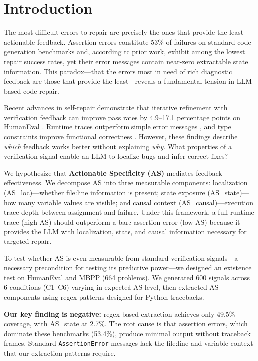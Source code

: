 \section{Introduction}

The most difficult errors to repair are precisely the ones that provide the least actionable feedback. Assertion errors constitute 53\% of failures on standard code generation benchmarks and, according to prior work, exhibit among the lowest repair success rates, yet their error messages contain near-zero extractable state information. This paradox---that the errors most in need of rich diagnostic feedback are those that provide the least---reveals a fundamental tension in LLM-based code repair.

Recent advances in self-repair demonstrate that iterative refinement with verification feedback can improve pass rates by 4.9--17.1 percentage points on HumanEval \citep{howmanytries2026}. Runtime traces outperform simple error messages \citep{debugrepair2026}, and type constraints improve functional correctness \citep{tyflow2025}. However, these findings describe \emph{which} feedback works better without explaining \emph{why}. What properties of a verification signal enable an LLM to localize bugs and infer correct fixes?

We hypothesize that \textbf{Actionable Specificity (AS)} mediates feedback effectiveness. We decompose AS into three measurable components: localization (AS\_loc)---whether file:line information is present; state exposure (AS\_state)---how many variable values are visible; and causal context (AS\_causal)---execution trace depth between assignment and failure. Under this framework, a full runtime trace (high AS) should outperform a bare assertion error (low AS) because it provides the LLM with localization, state, and causal information necessary for targeted repair.

To test whether AS is even measurable from standard verification signals---a necessary precondition for testing its predictive power---we designed an existence test on HumanEval and MBPP (664 problems). We generated 600 signals across 6 conditions (C1--C6) varying in expected AS level, then extracted AS components using regex patterns designed for Python tracebacks.

\textbf{Our key finding is negative:} regex-based extraction achieves only 49.5\% coverage, with AS\_state at 2.7\%. The root cause is that assertion errors, which dominate these benchmarks (53.4\%), produce minimal output without traceback frames. Standard \texttt{AssertionError} messages lack the file:line and variable context that our extraction patterns require.

